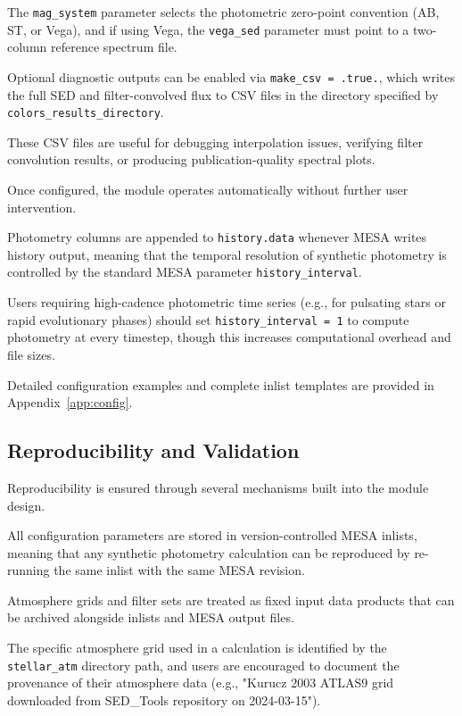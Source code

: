 \documentclass[linenumbers,apj,twocolumn, floatfix]{aastex701}
\begin{document}
The \texttt{mag\_system} parameter selects the photometric zero-point convention (AB, ST, or Vega), and if using Vega, the \texttt{vega\_sed} parameter must point to a two-column reference spectrum file. 

Optional diagnostic outputs can be enabled via \texttt{make\_csv = .true.}, which writes the full SED and filter-convolved flux to CSV files in the directory specified by \texttt{colors\_results\_directory}. 

These CSV files are useful for debugging interpolation issues, verifying filter convolution results, or producing publication-quality spectral plots.

Once configured, the module operates automatically without further user intervention. 

Photometry columns are appended to \texttt{history.data} whenever MESA writes history output, meaning that the temporal resolution of synthetic photometry is controlled by the standard MESA parameter \texttt{history\_interval}. 

Users requiring high-cadence photometric time series (e.g., for pulsating stars or rapid evolutionary phases) should set \texttt{history\_interval = 1} to compute photometry at every timestep, though this increases computational overhead and file sizes. 

Detailed configuration examples and complete inlist templates are provided in Appendix~\ref{app:config}.

\subsection{Reproducibility and Validation}
\label{sec:reproducibility}

Reproducibility is ensured through several mechanisms built into the module design. 

All configuration parameters are stored in version-controlled MESA inlists, meaning that any synthetic photometry calculation can be reproduced by re-running the same inlist with the same MESA revision. 

Atmosphere grids and filter sets are treated as fixed input data products that can be archived alongside inlists and MESA output files. 

The specific atmosphere grid used in a calculation is identified by the \texttt{stellar\_atm} directory path, and users are encouraged to document the provenance of their atmosphere data (e.g., "Kurucz 2003 ATLAS9 grid downloaded from SED\_Tools repository on 2024-03-15").
\end{document}
